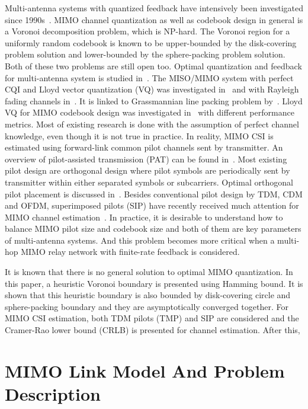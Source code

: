 \documentclass[10pt,fleqn, twocolumn]{IEEEtran}
\begin{document}
Multi-antenna systems with quantized feedback have intensively
been investigated since 1990s~\cite{Gerlach94}. MIMO channel
quantization as well as codebook design in general is a Voronoi
decomposition problem, which is NP-hard. The Voronoi region for a
uniformly random codebook is known to be upper-bounded by the
disk-covering problem solution and lower-bounded by the
sphere-packing problem solution. Both of these two problems are
still open too. Optimal quantization and feedback for
multi-antenna system is studied in~\cite{Lau04}. The MISO/MIMO
system with perfect CQI and Lloyd vector quantization (VQ) was
investigated in~\cite{Narula98,PXia04,Roh04} and with Rayleigh
fading channels in~\cite{Mukka03}. It is linked to Grassmannian
line packing problem by~\cite{Love02}. Lloyd VQ for MIMO codebook
design was investigated in~\cite{PXia04,Roh04} with different
performance metrics. Most of existing research is done with the
assumption of perfect channel knowledge, even though it is not
true in practice. In reality, MIMO CSI is estimated using
forward-link common pilot channels sent by transmitter. An
overview of pilot-assisted transmission (PAT) can be found
in~\cite{Tong04}. Most existing pilot design are orthogonal design
where pilot symbols are periodically sent by transmitter within
either separated symbols or subcarriers. Optimal orthogonal pilot
placement is discussed in~\cite{Dong02}. Besides conventional
pilot design by TDM, CDM and OFDM, superimposed pilots (SIP) have
recently received much attention for MIMO channel
estimation~\cite{Coldrey06}. In practice, it is desirable to
understand how to balance MIMO pilot size and codebook size and
both of them are key parameters of multi-antenna systems. And this
problem becomes more critical when a multi-hop MIMO relay network
with finite-rate feedback is considered.

It is known that there is no general solution to optimal MIMO
quantization. In this paper, a heuristic Voronoi boundary is
presented using Hamming bound. It is shown that this heuristic
boundary is also bounded by disk-covering circle and
sphere-packing boundary and they are asymptotically converged
together. For MIMO CSI estimation, both TDM pilots (TMP) and SIP
are considered and the Cramer-Rao lower bound (CRLB) is presented
for channel estimation. After this,

\section{MIMO Link Model And Problem Description\label{MIMO_system_model}}
\end{document}
